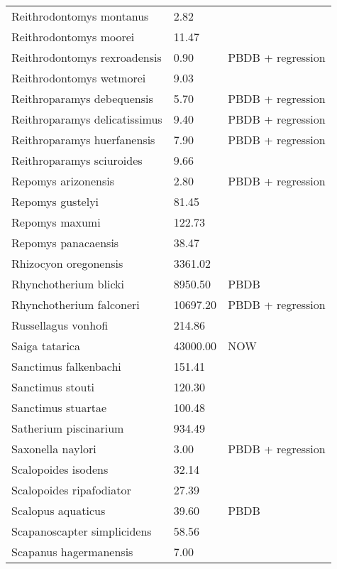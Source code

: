\begin{longtable}{p{} p{} p{}}
    Reithrodontomys montanus & 2.82 & \cite{Smith2004} \\ 
    Reithrodontomys moorei & 11.47 & \cite{Tomiya2013} \\ 
    Reithrodontomys rexroadensis & 0.90 & PBDB + regression \\ 
    Reithrodontomys wetmorei & 9.03 & \cite{Tomiya2013} \\ 
    Reithroparamys debequensis & 5.70 & PBDB + regression \\ 
    Reithroparamys delicatissimus & 9.40 & PBDB + regression \\ 
    Reithroparamys huerfanensis & 7.90 & PBDB + regression \\ 
    Reithroparamys sciuroides & 9.66 & \cite{Wang1994a} \\ 
    Repomys arizonensis & 2.80 & PBDB + regression \\ 
    Repomys gustelyi & 81.45 & \cite{Tomiya2013} \\ 
    Repomys maxumi & 122.73 & \cite{Tomiya2013} \\ 
    Repomys panacaensis & 38.47 & \cite{Tomiya2013} \\ 
    Rhizocyon oregonensis & 3361.02 & \cite{Tomiya2013} \\ 
    Rhynchotherium blicki & 8950.50 & PBDB \\ 
    Rhynchotherium falconeri & 10697.20 & PBDB + regression \\ 
    Russellagus vonhofi & 214.86 & \cite{Tomiya2013} \\ 
    Saiga tatarica & 43000.00 & NOW \\ 
    Sanctimus falkenbachi & 151.41 & \cite{Tomiya2013} \\ 
    Sanctimus stouti & 120.30 & \cite{Tomiya2013} \\ 
    Sanctimus stuartae & 100.48 & \cite{Tomiya2013} \\ 
    Satherium piscinarium & 934.49 & \cite{Tomiya2013} \\ 
    Saxonella naylori & 3.00 & PBDB + regression \\ 
    Scalopoides isodens & 32.14 & \cite{Tomiya2013} \\ 
    Scalopoides ripafodiator & 27.39 & \cite{Tomiya2013} \\ 
    Scalopus aquaticus & 39.60 & PBDB \\ 
    Scapanoscapter simplicidens & 58.56 & \cite{Tomiya2013} \\ 
    Scapanus hagermanensis & 7.00 & \cite{McKenna2011} \\ 

\end{longtable}
